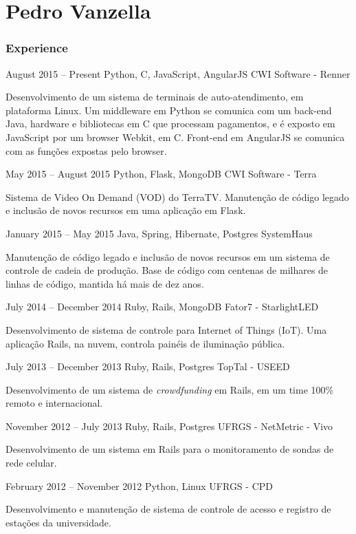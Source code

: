 \documentclass{tccv}
\begin{document}
\part{Pedro Vanzella}

\section{Experience}

\begin{eventlist}

\item{August 2015 -- Present}
     {Python, C, JavaScript, AngularJS}
     {CWI Software - Renner}

Desenvolvimento de um sistema de terminais de auto-atendimento, em plataforma
Linux. Um middleware em Python se comunica com um back-end Java, hardware e
bibliotecas em C que processam pagamentos, e é exposto em JavaScript por um
browser Webkit, em C. Front-end em AngularJS se comunica com as funções expostas
pelo browser.

\item{May 2015 -- August 2015}
     {Python, Flask, MongoDB}
     {CWI Software - Terra}

Sistema de Video On Demand (VOD) do TerraTV. Manutenção de código legado e inclusão
de novos recursos em uma aplicação em Flask.

\item{January 2015 -- May 2015}
     {Java, Spring, Hibernate, Postgres}
     {SystemHaus}

Manutenção de código legado e inclusão de novos recursos em um sistema de
controle de cadeia de produção. Base de código com centenas de milhares de
linhas de código, mantida há mais de dez anos.

\item{July 2014 -- December 2014}
     {Ruby, Rails, MongoDB}
     {Fator7 - StarlightLED}

Desenvolvimento de sistema de controle para Internet of Things (IoT). Uma
aplicação Rails, na nuvem, controla painéis de iluminação pública.

\item{July 2013 -- December 2013}
     {Ruby, Rails, Postgres}
     {TopTal - USEED}

Desenvolvimento de um sistema de \textit{crowdfunding} em Rails, em um time
100\% remoto e internacional.

\item{November 2012 -- July 2013}
     {Ruby, Rails, Postgres}
     {UFRGS - NetMetric - Vivo}
 
Desenvolvimento de um sistema em Rails para o monitoramento de sondas de rede celular.

\item{February 2012 -- November 2012}
     {Python, Linux}
     {UFRGS - CPD}

Desenvolvimento e manutenção de sistema de controle de acesso e registro de
estações da universidade.

\end{eventlist}
\end{document}
